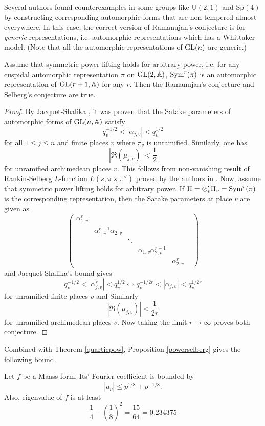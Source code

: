 Several authors found counterexamples in some groups like $\mathrm{U}(2, 1)$ and $\mathrm{Sp}(4)$
by constructing corresponding automorphic forms that are non-tempered almost everywhere.
In this case, the correct version of Ramanujan's conjecture is for \emph{generic}
representations, i.e. automorphic representations which has a Whittaker model.
(Note that all the automorphic representations of $\operatorname{\mathrm{GL}}(n)$ are generic.)


\begin{proposition}
\label{powerselberg}
Assume that symmetric power lifting holds for arbitrary power, i.e. for any cuspidal automorphic representation $\pi$ on $\operatorname{\mathrm{GL}}(2,\mathbb{A})$,  $\mathrm{Sym}^{r}(\pi)$ is an automorphic representation of $\operatorname{\mathrm{GL}}(r + 1, \mathbb{A})$ for any $r$.
Then the Ramanujan's conjecture and Selberg's conjecture are true.
\end{proposition}
\begin{proof}
By Jacquet-Shalika \cite{jacquet1981euler}, it was proven that the Satake parameters of automorphic forms of $\operatorname{\mathrm{GL}}(n, \mathbb{A})$ satisfy 
$$
q_{v}^{-1/2} < |\alpha_{j,v}| < q_{v}^{1/2}
$$
for all $1\leq j\leq n$ and finite places $v$ where $\pi_{v}$ is unramified.
Similarly, one has
$$
|\Re(\mu_{j, v})| < \frac{1}{2}
$$
for unramified archimedean places $v$.
This follows from non-vanishing result of Rankin-Selberg $L$-function $L(s, \pi \times \pi^{\vee})$ proved by the authors in \cite{jacquet1981euler}.
Now, assume that symmetric power lifting holds for arbitrary power. 
If $\Pi = \otimes_{v}'\Pi_{v} = \mathrm{Sym}^{r}(\pi)$ is the corresponding representation, then the Satake parameters at place $v$ are given as
$$
\begin{pmatrix}
\alpha_{1, v}^{r} & & & & \\ 
& \alpha_{1, v}^{r-1}\alpha_{2, v} & & & \\ 
& & \ddots & & & \\
& & & \alpha_{1, v}\alpha_{2, v}^{r-1} & \\
& & & & \alpha_{2, v}^{r}
\end{pmatrix}
$$
and Jacquet-Shalika's bound gives 
$$
q_{v}^{-1/2} < |\alpha_{j, v}^{r}| < q_{v}^{1/2} \Longleftrightarrow q_{v}^{-1/2r} < |\alpha_{j, v}| < q_{v}^{1/2r}
$$
for unramified finite places $v$ and Similarly
$$
|\Re(\mu_{j, v})| < \frac{1}{2r}
$$
for unramified archimedean places $v$.
Now taking the limit $r\to \infty$ proves both conjecture.
\end{proof}

Combined with Theorem \ref{quarticpow}, Proposition \ref{powerselberg} gives the following bound.
\begin{corollary}
Let $f$ be a Maass form. Its' Fourier coefficient is bounded by
$$
|a_{p}| \leq p^{1/8} + p^{-1/8}.
$$
Also, eigenvalue of $f$ is at least
$$
\frac{1}{4} - \left(\frac{1}{8}\right)^{2} = \frac{15}{64} = 0.234375
$$
\end{corollary}

